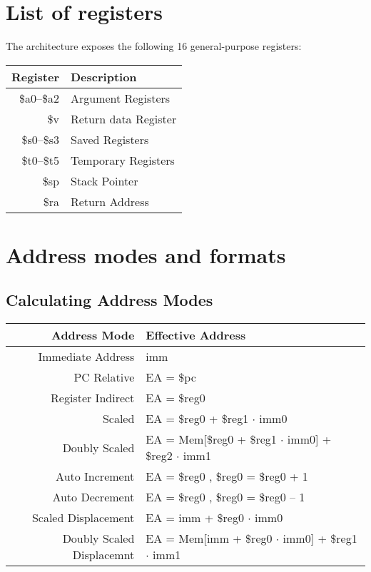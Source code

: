 \documentclass[12pt]{article}
\begin{document}
\section{List of registers}
The architecture exposes the following 16 general-purpose registers:

\vspace{6pt}
\begin{tabular}{| r | l |}
\hline
\textbf{Register} & \textbf{Description}\\
\hline
\$a0--\$a2 & Argument Registers\\
\$v & Return data Register\\
\$s0--\$s3 & Saved Registers\\
\$t0--\$t5 & Temporary Registers\\
\$sp & Stack Pointer\\
\$ra & Return Address\\ 
\hline
\end {tabular}

\section{Address modes and formats}
\subsection{Calculating Address Modes}
\begin{tabular}{| r | l |}
\hline
\textbf{Address Mode} & \textbf {Effective Address} \\
\hline
Immediate Address & imm\\
PC Relative & EA = \$pc \\
Register Indirect & EA = \$reg0\\
Scaled & EA = \$reg0 + \$reg1 $\cdot$ imm0\\
Doubly Scaled & EA = Mem[\$reg0 + \$reg1 $\cdot$ imm0] + \$reg2 $\cdot$ imm1 \\
Auto Increment & EA = \$reg0 , \$reg0 = \$reg0 + 1\\
Auto Decrement & EA = \$reg0 , \$reg0 = \$reg0 -- 1\\
Scaled Displacement & EA = imm + \$reg0 $\cdot$ imm0\\
Doubly Scaled Displacemnt & EA = Mem[imm + \$reg0 $\cdot$ imm0] + \$reg1 $\cdot$ imm1\\
\hline
\end{tabular}
\end{document}
